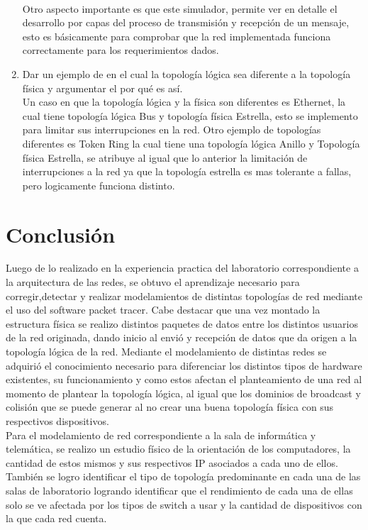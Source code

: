 \documentclass[spanish]{udpreport}
\begin{document}
\begin{enumerate}
    \\Otro aspecto importante es que este simulador, permite ver en detalle el desarrollo por capas del proceso de transmisión y recepción de un mensaje, esto es básicamente para comprobar que la red implementada funciona correctamente para los requerimientos dados.
    \item Dar un ejemplo de en el cual la topología lógica sea diferente a la topología física y argumentar el por qué es así.
    \\ Un caso en que la topología lógica y la física son diferentes es Ethernet, la cual tiene topología lógica Bus y topología física Estrella, esto se implemento para limitar sus interrupciones en la red. Otro ejemplo de topologías diferentes es Token Ring la cual tiene una topología lógica Anillo y Topología física Estrella, se atribuye al igual que lo anterior la limitación de interrupciones a la red ya que la topología estrella es mas tolerante a fallas, pero logicamente funciona distinto.

\end{enumerate}
\newpage
\chapter{Conclusión}
Luego de lo realizado en la experiencia practica del laboratorio correspondiente a la arquitectura de las redes, se obtuvo 
el aprendizaje necesario para corregir,detectar y realizar modelamientos de distintas topologías de red
mediante el uso del software packet tracer. Cabe destacar que una vez montado la estructura física se realizo distintos 
paquetes de datos entre los distintos usuarios de la red originada, dando inicio al envió y recepción de datos
que da origen a la topología lógica de la red. Mediante el modelamiento de distintas redes se adquirió el conocimiento 
necesario para diferenciar los distintos tipos de hardware existentes, su funcionamiento y como estos afectan el 
planteamiento de una red al momento de plantear la topología lógica, al igual que los dominios de broadcast y colisión que 
se puede generar al no crear una buena topología física con sus respectivos dispositivos.
\\[0.2cm]
Para el modelamiento de red correspondiente a la sala de informática y telemática, se realizo un estudio físico 
de la orientación de los computadores, la cantidad de estos mismos y sus respectivos IP asociados a cada uno de ellos.
También se logro identificar el tipo de topología predominante en cada una de las salas de laboratorio logrando 
identificar que el rendimiento de cada una de ellas solo se ve afectada por los tipos de switch a usar y la cantidad
de dispositivos con la que cada red cuenta.
\end{document}
